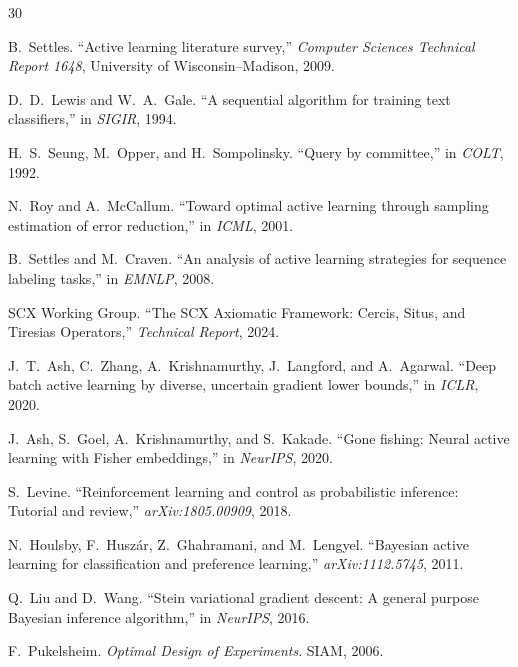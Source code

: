 \documentclass[12pt,a4paper]{article}
\begin{document}

\begin{thebibliography}{30}

B.~Settles.
\newblock ``Active learning literature survey,''
\newblock \emph{Computer Sciences Technical Report 1648}, University of
Wisconsin--Madison, 2009.

D.~D.~Lewis and W.~A.~Gale.
\newblock ``A sequential algorithm for training text classifiers,''
\newblock in \emph{SIGIR}, 1994.

H.~S.~Seung, M.~Opper, and H.~Sompolinsky.
\newblock ``Query by committee,''
\newblock in \emph{COLT}, 1992.

N.~Roy and A.~McCallum.
\newblock ``Toward optimal active learning through sampling estimation of
error reduction,''
\newblock in \emph{ICML}, 2001.

B.~Settles and M.~Craven.
\newblock ``An analysis of active learning strategies for
sequence labeling tasks,''
\newblock in \emph{EMNLP}, 2008.

SCX Working Group.
\newblock ``The SCX Axiomatic Framework: Cercis, Situs, and Tiresias
Operators,''
\newblock \emph{Technical Report}, 2024.

J.~T.~Ash, C.~Zhang, A.~Krishnamurthy, J.~Langford, and A.~Agarwal.
\newblock ``Deep batch active learning by diverse, uncertain gradient lower
bounds,''
\newblock in \emph{ICLR}, 2020.

J.~Ash, S.~Goel, A.~Krishnamurthy, and S.~Kakade.
\newblock ``Gone fishing: Neural active learning with Fisher embeddings,''
\newblock in \emph{NeurIPS}, 2020.

S.~Levine.
\newblock ``Reinforcement learning and control as probabilistic inference:
Tutorial and review,''
\newblock \emph{arXiv:1805.00909}, 2018.

N.~Houlsby, F.~Husz\'ar, Z.~Ghahramani, and M.~Lengyel.
\newblock ``Bayesian active learning for classification and preference
learning,''
\newblock \emph{arXiv:1112.5745}, 2011.

Q.~Liu and D.~Wang.
\newblock ``Stein variational gradient descent: A general purpose Bayesian
inference algorithm,''
\newblock in \emph{NeurIPS}, 2016.

F.~Pukelsheim.
\newblock \emph{Optimal Design of Experiments}.
\newblock SIAM, 2006.

\end{thebibliography}
\end{document}
